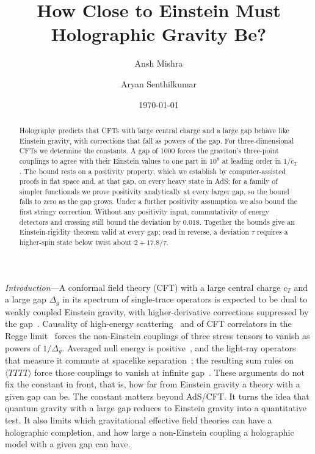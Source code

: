 \documentclass[aps,prl,twocolumn,superscriptaddress,nofootinbib,floatfix]{revtex4-2}
\begin{document}
\title{How Close to Einstein Must Holographic Gravity Be?}

\author{Ansh Mishra}
\author{Aryan Senthilkumar}

\date{\today}

\begin{abstract}
Holography predicts that CFTs with large central charge and a large gap behave like Einstein
gravity, with corrections that fall as powers of the gap. For three-dimensional CFTs we determine the
constants. A gap of 1000 forces the graviton's three-point couplings to agree with their Einstein values
to one part in $10^8$ at leading order in $1/c_T$. The bound rests on a positivity property, which we establish by computer-assisted proofs in flat space and, at that gap, on every heavy state in AdS; for a family of simpler functionals we prove positivity analytically at every larger gap, so the bound falls to zero as the gap grows.
Under a further positivity assumption we also bound the first stringy correction. Without any positivity input, commutativity of energy detectors and crossing still bound the deviation by $0.018$. Together the bounds give an Einstein-rigidity theorem valid at every gap; read in reverse, a deviation $\tau$ requires a
higher-spin state below twist about $2+17.8/\tau$.
\end{abstract}

\maketitle

\textit{Introduction}---A conformal field theory (CFT) with a large central charge $c_T$ and a large gap
$\Delta_g$ in its spectrum of single-trace operators is expected to be dual to weakly coupled Einstein
gravity, with higher-derivative corrections suppressed by the gap~\cite{HPPS}. Causality of high-energy scattering~\cite{CEMZ} and of CFT correlators in the
Regge limit~\cite{HJK,AHKT,CHP,MeltzerPerlmutter,AKT} forces the non-Einstein couplings of three stress
tensors to vanish as powers of $1/\Delta_g$. Averaged null energy is positive~\cite{HofmanMaldacena,HKT},
and the light-ray operators that measure it commute at spacelike separation~\cite{KKSDZ,KKSDZlightray}; the
resulting sum rules on $\langle TTTT\rangle$ force those couplings to vanish at infinite
gap~\cite{KKSDZ,BHM}. These arguments do not fix the constant in front, that is, how far from Einstein
gravity a theory with a given gap can be. The constant matters beyond AdS/CFT. It turns the idea that quantum
gravity with a large gap reduces to Einstein gravity into a quantitative test. It also limits which gravitational
effective field theories can have a holographic completion, and how large a non-Einstein coupling a holographic
model with a given gap can have.
\end{document}

